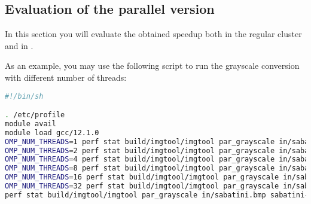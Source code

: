 \subsection{Evaluation of the parallel version}

In this section you will evaluate the obtained speedup both in the regular
cluster and in .

As an example, you may use the following script to run the grayscale conversion
with different number of threads:

\begin{lstlisting}[language=bash]
#!/bin/sh

. /etc/profile
module avail
module load gcc/12.1.0
OMP_NUM_THREADS=1 perf stat build/imgtool/imgtool par_grayscale in/sabatini.bmp sabatini-gpar.bmp
OMP_NUM_THREADS=2 perf stat build/imgtool/imgtool par_grayscale in/sabatini.bmp sabatini-gpar.bmp
OMP_NUM_THREADS=4 perf stat build/imgtool/imgtool par_grayscale in/sabatini.bmp sabatini-gpar.bmp
OMP_NUM_THREADS=8 perf stat build/imgtool/imgtool par_grayscale in/sabatini.bmp sabatini-gpar.bmp
OMP_NUM_THREADS=16 perf stat build/imgtool/imgtool par_grayscale in/sabatini.bmp sabatini-gpar.bmp
OMP_NUM_THREADS=32 perf stat build/imgtool/imgtool par_grayscale in/sabatini.bmp sabatini-gpar.bmp
perf stat build/imgtool/imgtool par_grayscale in/sabatini.bmp sabatini-gpar.bmp
\end{lstlisting}
